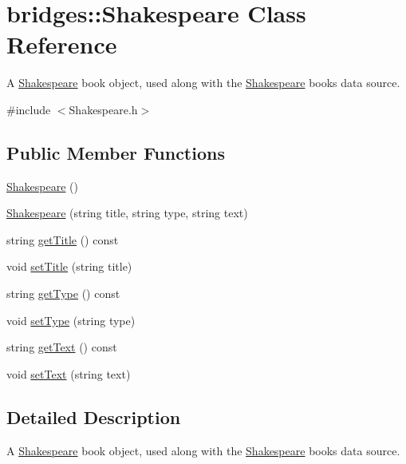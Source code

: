 \hypertarget{classbridges_1_1_shakespeare}{}\section{bridges\+:\+:Shakespeare Class Reference}
\label{classbridges_1_1_shakespeare}


A \hyperlink{classbridges_1_1_shakespeare}{Shakespeare} book object, used along with the \hyperlink{classbridges_1_1_shakespeare}{Shakespeare} books data source.  




{\ttfamily \#include $<$Shakespeare.\+h$>$}

\subsection*{Public Member Functions}
\begin{DoxyCompactItemize}
\item 
\hyperlink{classbridges_1_1_shakespeare_aa1903f3ffb483345c4053c2f315571eb}{Shakespeare} ()
\item 
\hyperlink{classbridges_1_1_shakespeare_a020cc81d13f5c17e362d467d700ac781}{Shakespeare} (string title, string type, string text)
\item 
string \hyperlink{classbridges_1_1_shakespeare_af23ec257146d9a50cf8686dd394ad47b}{get\+Title} () const 
\item 
void \hyperlink{classbridges_1_1_shakespeare_a533ff5a5dd8681ab1156c7345f85ad82}{set\+Title} (string title)
\item 
string \hyperlink{classbridges_1_1_shakespeare_a9bea73dcf0f110601c704c7c22f1f4ab}{get\+Type} () const 
\item 
void \hyperlink{classbridges_1_1_shakespeare_a2bc1ebcfa8b28a590a1f6f83e26ce051}{set\+Type} (string type)
\item 
string \hyperlink{classbridges_1_1_shakespeare_ae9220e3bb7ec01021996542bea34054d}{get\+Text} () const 
\item 
void \hyperlink{classbridges_1_1_shakespeare_a58e8cb2a96ce9af45fcf963694a3aba7}{set\+Text} (string text)
\end{DoxyCompactItemize}


\subsection{Detailed Description}
A \hyperlink{classbridges_1_1_shakespeare}{Shakespeare} book object, used along with the \hyperlink{classbridges_1_1_shakespeare}{Shakespeare} books data source. 

